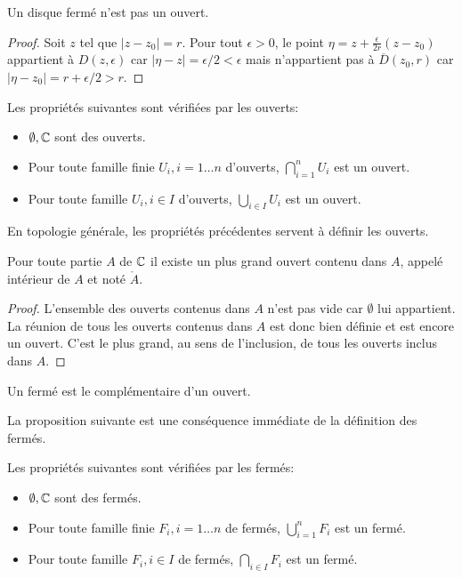 \begin{fprop}
	Un disque fermé n'est pas un ouvert.
\end{fprop}
\begin{proof}
	Soit $z$ tel que $|z-z_0| = r$. Pour tout $\epsilon > 0$, le point $\eta = z + \frac{\epsilon}{2r}(z-z_0)$ appartient à $D(z,\epsilon)$ car $|\eta - z| = \epsilon / 2 < \epsilon$ mais n'appartient pas à $\overline{D}(z_0,r)$ car $|\eta - z_0| = r+\epsilon/2 > r$.
\end{proof}
\begin{fprop}
	Les propriétés suivantes sont vérifiées par les ouverts:
	\begin{itemize}
		\item $\emptyset,\mathbb{C}$ sont des ouverts.
		\item Pour toute famille finie $U_i, i=1\dots n$ d'ouverts, $\bigcap_{i=1}^n U_i$ est un ouvert.
		\item Pour toute famille $U_i, i \in I$ d'ouverts, $\bigcup_{i \in I}U_i$ est un ouvert.
	\end{itemize}
\end{fprop}
\begin{rem}
	En topologie générale, les propriétés précédentes servent à définir les ouverts. 
\end{rem}
\begin{fprop}
	Pour toute partie $A$ de $\mathbb{C}$ il existe un plus grand ouvert contenu dans $A$, appelé intérieur de $A$ et noté $\mathring{A}$.
\end{fprop}
\begin{proof}
	L'ensemble des ouverts contenus dans $A$ n'est pas vide car $\emptyset$ lui appartient. La réunion de tous les ouverts contenus dans $A$ est donc bien définie et est encore un ouvert. C'est le plus grand, au sens de l'inclusion, de tous les ouverts inclus dans $A$.
\end{proof}
\begin{fdefn}
	Un fermé est le complémentaire d'un ouvert.
\end{fdefn}
La proposition suivante est une conséquence immédiate de la définition des fermés.
\begin{fprop}
	Les propriétés suivantes sont vérifiées par les fermés:
	\begin{itemize}
		\item $\emptyset,\mathbb{C}$ sont des fermés.
		\item Pour toute famille finie $F_i, i=1\dots n$ de fermés, $\bigcup_{i=1}^n F_i$ est un fermé.
		\item Pour toute famille $F_i, i \in I$ de fermés, $\bigcap_{i \in I}F_i$ est un fermé.
	\end{itemize}
\end{fprop}

